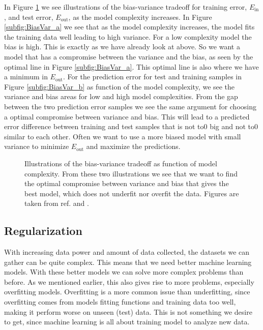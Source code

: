 \documentclass[a4paper, american, 12pt]{report}
\begin{document}
	In Figure \ref{fig:BiasVar} we see illustrations of the bias-variance tradeoff for training error, $E_{\text{in}}$, and test error, $E_{\text{out}}$, as the model complexity increases. In Figure \ref{subfig:BiasVar_a} we see that as the model complexity increases, the model fits the training data well leading to high variance. For a low complexity model the bias is high. This is exactly as we have already look at above. So we want a model that has a compromise between the variance and the bias, as seen by the optimal line in Figure \ref{subfig:BiasVar_a}. This optimal line is also where we have a minimum in $E_{\text{out}}$. For the prediction error for test and training samples in Figure \ref{subfig:BiasVar_b} as function of the model complexity, we see the variance and bias areas for low and high model complexities. From the gap between the two prediction error samples we see the same argument for choosing a optimal compromise between variance and bias. This will lead to a predicted error difference between training and test samples that is not to0 big and not to0 similar to each other. Often we want to use a more biased model with small variance to minimize $E_{\text{out}}$ and maximize the predictions.
	\begin{figure}[h!]
		\hspace*{-1.0cm}
		\hspace{0.45em}
		\caption[Bias-variance tradeoff and model complexity.]{Illustrations of the bias-variance tradeoff as function of model complexity. From these two illustrations we see that we want to find the optimal compromise between variance and bias that gives the best model, which does not underfit nor overfit the data. Figures are taken from ref. \citet{hastie2009elements} and \citet{mehta2019high}. \label{fig:BiasVar}}
	\end{figure}


	\subsection{Regularization}
	\label{subsect:Theory-Regularization}
	With increasing data power and amount of data collected, the datasets we can gather can be quite complex. This means that we need better machine learning models. With these better models we can solve more complex problems than before. As we mentioned earlier, this also gives rise to more problems, especially overfitting models. Overfitting is a more common issue than underfitting, since overfitting comes from models fitting functions and training data too well, making it perform worse on unseen (test) data. This is not something we desire to get, since machine learning is all about training model to analyze new data.
	
\end{document}
